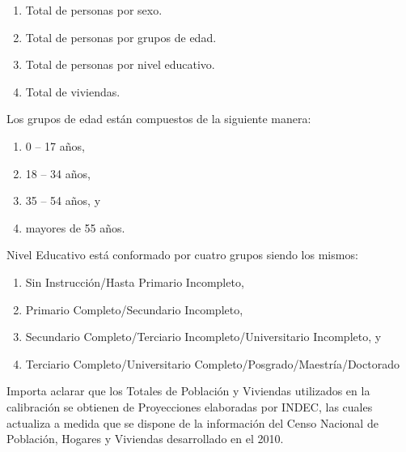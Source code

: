 \documentclass[
  openany]{book}
\begin{document}
\begin{enumerate}
\def\labelenumi{\arabic{enumi}.}
\item
  Total de personas por sexo.
\item
  Total de personas por grupos de edad.
\item
  Total de personas por nivel educativo.
\item
  Total de viviendas.
\end{enumerate}

Los grupos de edad están compuestos de la siguiente manera:

\begin{enumerate}
\def\labelenumi{\arabic{enumi}.}
\item
  0 -- 17 años,
\item
  18 -- 34 años,
\item
  35 -- 54 años, y
\item
  mayores de 55 años.
\end{enumerate}

Nivel Educativo está conformado por cuatro grupos siendo los mismos:

\begin{enumerate}
\def\labelenumi{\arabic{enumi}.}
\item
  Sin Instrucción/Hasta Primario Incompleto,
\item
  Primario Completo/Secundario Incompleto,
\item
  Secundario Completo/Terciario Incompleto/Universitario Incompleto, y
\item
  Terciario Completo/Universitario Completo/Posgrado/Maestría/Doctorado
\end{enumerate}

Importa aclarar que los Totales de Población y Viviendas utilizados en la calibración se obtienen de Proyecciones elaboradas por INDEC, las cuales actualiza a medida que se dispone de la información del Censo Nacional de Población, Hogares y Viviendas desarrollado en el 2010.
\end{document}
